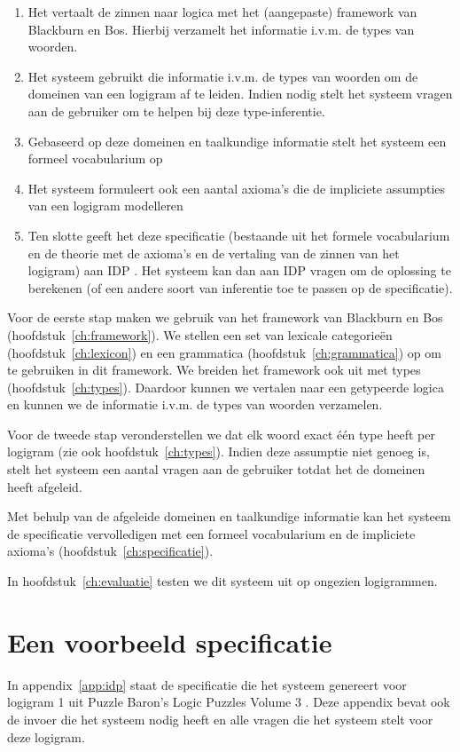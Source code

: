 \begin{enumerate}
  \item Het vertaalt de zinnen naar logica met het (aangepaste) framework van Blackburn en Bos. Hierbij verzamelt het informatie i.v.m. de types van woorden.
  \item Het systeem gebruikt die informatie i.v.m. de types van woorden om de domeinen van een logigram af te leiden. Indien nodig stelt het systeem vragen aan de gebruiker om te helpen bij deze type-inferentie.
  \item Gebaseerd op deze domeinen en taalkundige informatie stelt het systeem een formeel vocabularium op
  \item Het systeem formuleert ook een aantal axioma's die de impliciete assumpties van een logigram modelleren
  \item Ten slotte geeft het deze specificatie (bestaande uit het formele vocabularium en de theorie met de axioma's en de vertaling van de zinnen van het logigram) aan IDP \cite{IDP}. Het systeem kan dan aan IDP vragen om de oplossing te berekenen (of een andere soort van inferentie toe te passen op de specificatie).
\end{enumerate}

Voor de eerste stap maken we gebruik van het framework van Blackburn en Bos (hoofdstuk~\ref{ch:framework}). We stellen een set van lexicale categorieën (hoofdstuk~\ref{ch:lexicon}) en een grammatica (hoofdstuk~\ref{ch:grammatica}) op om te gebruiken in dit framework. We breiden het framework ook uit met types (hoofdstuk~\ref{ch:types}). Daardoor kunnen we vertalen naar een getypeerde logica en kunnen we de informatie i.v.m. de types van woorden verzamelen.

Voor de tweede stap veronderstellen we dat elk woord exact één type heeft per logigram (zie ook hoofdstuk~\ref{ch:types}). Indien deze assumptie niet genoeg is, stelt het systeem een aantal vragen aan de gebruiker totdat het de domeinen heeft afgeleid. 

Met behulp van de afgeleide domeinen en taalkundige informatie kan het systeem de specificatie vervolledigen met een formeel vocabularium en de impliciete axioma's (hoofdstuk~\ref{ch:specificatie}).

In hoofdstuk~\ref{ch:evaluatie} testen we dit systeem uit op ongezien logigrammen. 

\section{Een voorbeeld specificatie}
In appendix~\ref{app:idp} staat de specificatie die het systeem genereert voor logigram 1 uit Puzzle Baron's Logic Puzzles Volume 3 \cite{logigrammen}. Deze appendix bevat ook de invoer die het systeem nodig heeft en alle vragen die het systeem stelt voor deze logigram.
